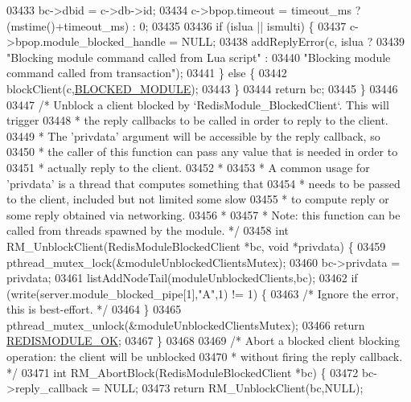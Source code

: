\begin{DoxyCode}
{{{{{{{{{{03433     bc->dbid = c->db->id;
03434     c->bpop.timeout = timeout\_ms ? (mstime()+timeout\_ms) : 0;
03435 
03436     \textcolor{keywordflow}{if} (islua || ismulti) \{
03437         c->bpop.module\_blocked\_handle = NULL;
03438         addReplyError(c, islua ?
03439             \textcolor{stringliteral}{"Blocking module command called from Lua script"} :
03440             \textcolor{stringliteral}{"Blocking module command called from transaction"});
03441     \} \textcolor{keywordflow}{else} \{
03442         blockClient(c,\hyperlink{server_8h_a6bdaa78b1c4c376ebf666afb891ace42}{BLOCKED\_MODULE});
03443     \}
03444     \textcolor{keywordflow}{return} bc;
03445 \}
03446 
03447 \textcolor{comment}{/* Unblock a client blocked by `RedisModule\_BlockedClient`. This will trigger}
03448 \textcolor{comment}{ * the reply callbacks to be called in order to reply to the client.}
03449 \textcolor{comment}{ * The 'privdata' argument will be accessible by the reply callback, so}
03450 \textcolor{comment}{ * the caller of this function can pass any value that is needed in order to}
03451 \textcolor{comment}{ * actually reply to the client.}
03452 \textcolor{comment}{ *}
03453 \textcolor{comment}{ * A common usage for 'privdata' is a thread that computes something that}
03454 \textcolor{comment}{ * needs to be passed to the client, included but not limited some slow}
03455 \textcolor{comment}{ * to compute reply or some reply obtained via networking.}
03456 \textcolor{comment}{ *}
03457 \textcolor{comment}{ * Note: this function can be called from threads spawned by the module. */}
03458 \textcolor{keywordtype}{int} RM\_UnblockClient(RedisModuleBlockedClient *bc, \textcolor{keywordtype}{void} *privdata) \{
03459     pthread\_mutex\_lock(&moduleUnblockedClientsMutex);
03460     bc->privdata = privdata;
03461     listAddNodeTail(moduleUnblockedClients,bc);
03462     \textcolor{keywordflow}{if} (write(server.module\_blocked\_pipe[1],\textcolor{stringliteral}{"A"},1) != 1) \{
03463         \textcolor{comment}{/* Ignore the error, this is best-effort. */}
03464     \}
03465     pthread\_mutex\_unlock(&moduleUnblockedClientsMutex);
03466     \textcolor{keywordflow}{return} \hyperlink{redismodule_8h_a1bc5bfd69abcd378ff52c640adc5418d}{REDISMODULE\_OK};
03467 \}
03468 
03469 \textcolor{comment}{/* Abort a blocked client blocking operation: the client will be unblocked}
03470 \textcolor{comment}{ * without firing the reply callback. */}
03471 \textcolor{keywordtype}{int} RM\_AbortBlock(RedisModuleBlockedClient *bc) \{
03472     bc->reply\_callback = NULL;
03473     \textcolor{keywordflow}{return} RM\_UnblockClient(bc,NULL);
}}}}}}}}}}
\end{DoxyCode}
